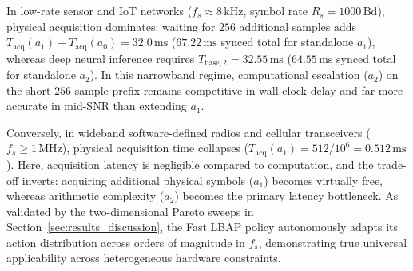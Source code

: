 In low-rate sensor and IoT networks ($f_s \approx 8\,\mathrm{kHz}$, symbol rate $R_s = 1000\,\mathrm{Bd}$), physical acquisition dominates: waiting for $256$ additional samples adds $T_{\mathrm{acq}}(a_1) - T_{\mathrm{acq}}(a_0) = 32.0\,\mathrm{ms}$ ($67.22\,\mathrm{ms}$ synced total for standalone $a_1$), whereas deep neural inference requires $T_{\mathrm{base}, 2} = 32.55\,\mathrm{ms}$ ($64.55\,\mathrm{ms}$ synced total for standalone $a_2$). In this narrowband regime, computational escalation ($a_2$) on the short $256$-sample prefix remains competitive in wall-clock delay and far more accurate in mid-SNR than extending $a_1$.

Conversely, in wideband software-defined radios and cellular transceivers ($f_s \ge 1\,\mathrm{MHz}$), physical acquisition time collapses ($T_{\mathrm{acq}}(a_1) = 512 / 10^6 = 0.512\,\mathrm{ms}$). Here, acquisition latency is negligible compared to computation, and the trade-off inverts: acquiring additional physical symbols ($a_1$) becomes virtually free, whereas arithmetic complexity ($a_2$) becomes the primary latency bottleneck. As validated by the two-dimensional Pareto sweeps in Section~\ref{sec:results_discussion}, the Fast LBAP policy autonomously adapts its action distribution across orders of magnitude in $f_s$, demonstrating true universal applicability across heterogeneous hardware constraints.
